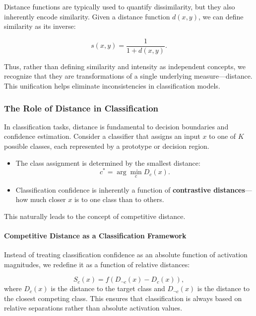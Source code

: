 Distance functions are typically used to quantify dissimilarity, but they also inherently encode similarity. Given a distance function \( d(x, y) \), we can define similarity as its inverse:

\[
    s(x, y) = \frac{1}{1 + d(x, y)}.
\]

Thus, rather than defining similarity and intensity as independent concepts, we recognize that they are transformations of a single underlying measure—distance. This unification helps eliminate inconsistencies in classification models.

\subsubsection{The Role of Distance in Classification}

In classification tasks, distance is fundamental to decision boundaries and confidence estimation. Consider a classifier that assigns an input \( x \) to one of \( K \) possible classes, each represented by a prototype or decision region.

\begin{itemize}
    \item The class assignment is determined by the smallest distance:
    \[
        c^* = \arg\min_{c} D_c(x).
    \]
    \item Classification confidence is inherently a function of \textbf{contrastive distances}—how much closer \( x \) is to one class than to others.
\end{itemize}

This naturally leads to the concept of competitive distance.

\paragraph{Competitive Distance as a Classification Framework}
Instead of treating classification confidence as an absolute function of activation magnitudes, we redefine it as a function of relative distances:

\[
    S_c(x) = f(D_{\neg c}(x) - D_c(x)),
\]
where \( D_c(x) \) is the distance to the target class and \( D_{\neg c}(x) \) is the distance to the closest competing class. This ensures that classification is always based on relative separations rather than absolute activation values.


